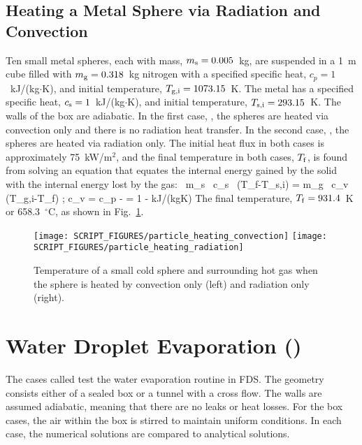 \documentclass[11pt]{book}
\begin{document}
\subsection{Heating a Metal Sphere via Radiation and Convection}
\label{particle_heating_convection}
\label{particle_heating_radiation}

Ten small metal spheres, each with mass, $m_{\rm s}=0.005$~kg, are suspended in a 1~m cube filled with $m_{\rm g}=0.318$~kg nitrogen with a specified specific heat, $c_p=1$~kJ/(kg$\cdot$K), and initial temperature, $T_{\rm g,i}=1073.15$~K. The metal has a specified specific heat, $c_{\rm s}=1$~kJ/(kg$\cdot$K), and initial temperature, $T_{\rm s,i}=293.15$~K. The walls of the box are adiabatic. In the first case, , the spheres are heated via convection only and there is no radiation heat transfer. In the second case, , the spheres are heated via radiation only. The initial heat flux in both cases is approximately 75~kW/m$^2$, and the final temperature in both cases, $T_{\rm f}$, is found from solving an equation that equates the internal energy gained by the solid with the internal energy lost by the gas:
 \, m_{\rm s} \, c_{\rm s} \, (T_{\rm f}-T_{\rm s,i}) = m_{\rm g} \, c_{v} \, (T_{\rm g,i}-T_{\rm f})  \quad ; \quad  c_v = c_p -  = 1 -   \; \hbox{kJ/(kg}\cdot\hbox{K})
\ee
The final temperature, $T_{\rm f}=931.4$~K or 658.3~$^\circ$C, as shown in Fig.~\ref{particle_heating_figs}.
\begin{figure}[ht]
\texttt{[image: SCRIPT\_FIGURES/particle\_heating\_convection]}
\texttt{[image: SCRIPT\_FIGURES/particle\_heating\_radiation]}
\caption[The  test cases]{Temperature of a small cold sphere and surrounding hot gas when the sphere is heated by convection only (left) and radiation only (right).}
\label{particle_heating_figs}
\end{figure}


\clearpage

\section{Water Droplet Evaporation (\texorpdfstring{{}}{water\_evaporation}) }
\label{water_evaporation}

The cases called  test the water evaporation routine in FDS. The geometry consists either of
a sealed box or a tunnel with a cross flow. The walls are assumed adiabatic, meaning that there are no leaks or heat losses.
For the box cases, the air within the box is stirred to maintain uniform conditions.
In each case, the numerical solutions are compared to analytical solutions.
\end{document}
